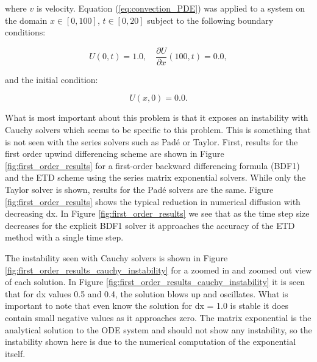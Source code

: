 \noindent where $v$ is velocity. Equation (\ref{eq:convection_PDE}) was applied to a system on the domain $x \in [0, 100]$, $t \in [0, 20]$ subject to the following boundary conditions:

\begin{equation}
    U(0,t) = 1.0, \quad\frac{\partial U}{\partial x}(100, t) = 0.0,
\end{equation}

\noindent and the initial condition:

\begin{equation}
    U(x,0) = 0.0.
\end{equation}

What is most important about this problem is that it exposes an instability with Cauchy solvers which seems to be specific to this problem. This is something that is not seen with the series solvers such as Pad\'e or Taylor. First, results for the first order upwind differencing scheme are shown in Figure \ref{fig:first_order_results}  for a first-order backward differencing formula (BDF1) and the ETD scheme using the series matrix exponential solvers. While only the Taylor solver is shown, results for the Pad\'e solvers are the same. Figure \ref{fig:first_order_results} shows the typical reduction in numerical diffusion with decreasing dx. In Figure \ref{fig:first_order_results} we see that as the time step size decreases for the explicit BDF1 solver it approaches the accuracy of the ETD method with a single time step. 

The instability seen with Cauchy solvers is shown in Figure \ref{fig:first_order_results_cauchy_instability} for a zoomed in and zoomed out view of each solution. In Figure \ref{fig:first_order_results_cauchy_instability} it is seen that for dx values 0.5 and 0.4, the solution blows up and oscillates. What is important to note that even know the solution for dx = 1.0 is stable it does contain small negative values as it approaches zero. The matrix exponential is the analytical solution to the ODE system and should not show any instability, so the instability shown here is due to the numerical computation of the exponential itself. 

\clearpage

